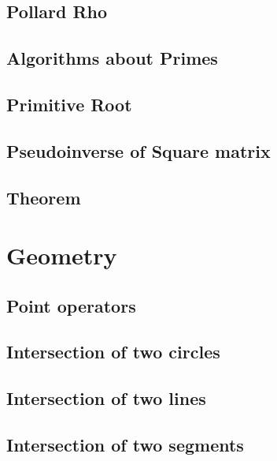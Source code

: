 \documentclass[a4paper,10pt,twocolumn,oneside]{article}
\begin{document}
\subsection{Pollard Rho}


\subsection{Algorithms about Primes}


\subsection{Primitive Root}


\subsection{Pseudoinverse of Square matrix}


\subsection{Theorem}



\section{Geometry}
\subsection{Point operators}


\subsection{Intersection of two circles}


\subsection{Intersection of two lines}


\subsection{Intersection of two segments}

\end{document}
